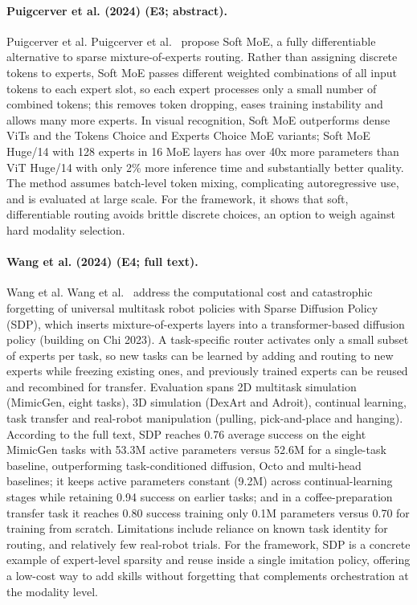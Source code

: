 \documentclass[10pt,a4paper]{article}
\begin{document}
\paragraph{Puigcerver et al. (2024) (E3; abstract).} Puigcerver et al. Puigcerver et al.~\cite{Puigcerver2024} propose Soft MoE, a fully differentiable alternative to sparse mixture-of-experts routing. Rather than assigning discrete tokens to experts, Soft MoE passes different weighted combinations of all input tokens to each expert slot, so each expert processes only a small number of combined tokens; this removes token dropping, eases training instability and allows many more experts. In visual recognition, Soft MoE outperforms dense ViTs and the Tokens Choice and Experts Choice MoE variants; Soft MoE Huge/14 with 128 experts in 16 MoE layers has over 40x more parameters than ViT Huge/14 with only 2\% more inference time and substantially better quality. The method assumes batch-level token mixing, complicating autoregressive use, and is evaluated at large scale. For the framework, it shows that soft, differentiable routing avoids brittle discrete choices, an option to weigh against hard modality selection.

\paragraph{Wang et al. (2024) (E4; full text).} Wang et al. Wang et al.~\cite{Wang2024b} address the computational cost and catastrophic forgetting of universal multitask robot policies with Sparse Diffusion Policy (SDP), which inserts mixture-of-experts layers into a transformer-based diffusion policy (building on Chi 2023). A task-specific router activates only a small subset of experts per task, so new tasks can be learned by adding and routing to new experts while freezing existing ones, and previously trained experts can be reused and recombined for transfer. Evaluation spans 2D multitask simulation (MimicGen, eight tasks), 3D simulation (DexArt and Adroit), continual learning, task transfer and real-robot manipulation (pulling, pick-and-place and hanging). According to the full text, SDP reaches 0.76 average success on the eight MimicGen tasks with 53.3M active parameters versus 52.6M for a single-task baseline, outperforming task-conditioned diffusion, Octo and multi-head baselines; it keeps active parameters constant (9.2M) across continual-learning stages while retaining 0.94 success on earlier tasks; and in a coffee-preparation transfer task it reaches 0.80 success training only 0.1M parameters versus 0.70 for training from scratch. Limitations include reliance on known task identity for routing, and relatively few real-robot trials. For the framework, SDP is a concrete example of expert-level sparsity and reuse inside a single imitation policy, offering a low-cost way to add skills without forgetting that complements orchestration at the modality level.
\end{document}

